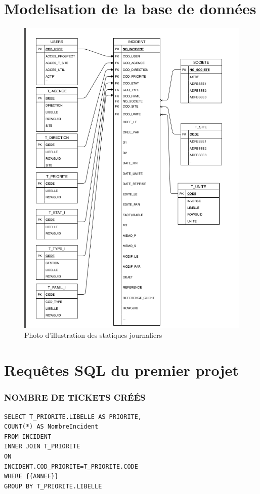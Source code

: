 \documentclass[a4paper,12pt]{report}
\begin{document}
\chapter{Modelisation de la base de données}

\begin{figure}[!h]
\begin{center}
\includegraphics[width=16cm]{image/bdd.png}
\end{center}
\caption{Photo d'illustration des statiques journaliers}
\label{Photo d'illustration}
\end{figure}

\chapter{Requêtes SQL du premier projet}

\subsection{NOMBRE DE TICKETS CRÉÉS}
\lstset{
language=SQL,
basicstyle=\footnotesize,
}
\begin{lstlisting}
SELECT T_PRIORITE.LIBELLE AS PRIORITE, 
COUNT(*) AS NombreIncident 
FROM INCIDENT
INNER JOIN T_PRIORITE
ON 
INCIDENT.COD_PRIORITE=T_PRIORITE.CODE
WHERE {{ANNEE}}
GROUP BY T_PRIORITE.LIBELLE
\end{lstlisting}
\end{document}
